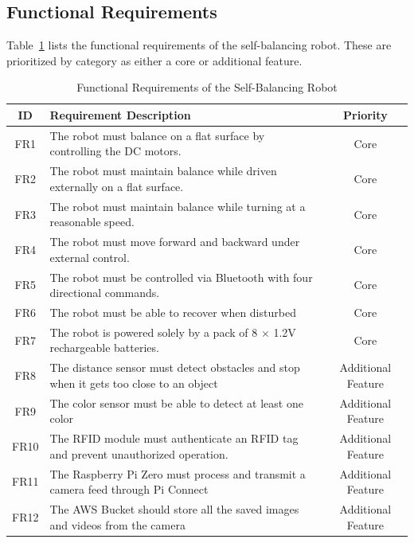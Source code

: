 \documentclass{article}
\begin{document}
\subsection{Functional Requirements}

Table~\ref{tab:functional_requirements} lists the functional requirements of the self-balancing robot. These are prioritized by category as
either a core or additional feature. \\

\begin{table}[H]
    \centering
    \renewcommand{\arraystretch}{1.3} %
    \begin{tabularx}{\textwidth}{|c|X|c|}
        \hline
        \textbf{ID} & \textbf{Requirement Description} & \textbf{Priority} \\
        \hline
        FR1 & The robot must balance on a flat surface by controlling the DC motors. & Core \\
        \hline
        FR2 & The robot must maintain balance while driven externally on a flat surface. & Core \\
        \hline
        FR3 & The robot must maintain balance while turning at a reasonable speed. & Core \\
        \hline
        FR4 & The robot must move forward and backward under external control. & Core \\
        \hline
        FR5 & The robot must be controlled via Bluetooth with four directional commands. & Core \\
        \hline
        FR6 & The robot must be able to recover when disturbed & Core \\
        \hline
        FR7 & The robot is powered solely by a pack of 8 $\times$ 1.2V rechargeable batteries. & Core \\
        \hline
        FR8 & The distance sensor must detect obstacles and stop when it gets too close to an object & Additional Feature \\
        \hline
        FR9 & The color sensor must be able to detect at least one color & Additional Feature \\
        \hline
        FR10 & The RFID module must authenticate an RFID tag and prevent unauthorized operation. & Additional Feature \\
        \hline
        FR11 & The Raspberry Pi Zero must process and transmit a camera feed through Pi Connect & Additional Feature \\
        \hline
        FR12 & The AWS Bucket should store all the saved images and videos from the camera & Additional Feature \\
        \hline
    \end{tabularx}
    \caption{Functional Requirements of the Self-Balancing Robot}
    \label{tab:functional_requirements}
\end{table}
\end{document}
